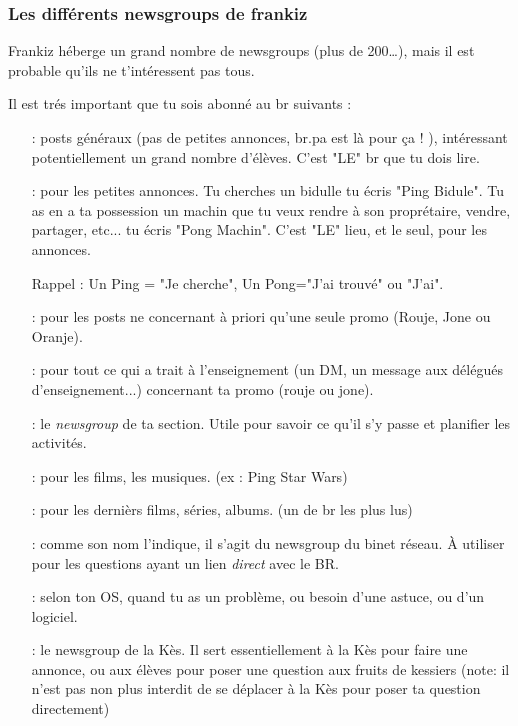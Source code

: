 \subsubsection{Les différents newsgroups de frankiz}
Frankiz héberge un grand nombre de newsgroups (plus de 200\dots ), mais il est probable qu'ils ne t'intéressent pas tous.

Il est trés important  que tu sois abonné au br suivants :
\begin{itemize}
\item[\ngname{br.eleves} :] posts généraux (pas de petites annonces, br.pa est là pour ça ! ), intéressant potentiellement un grand nombre d'élèves. C'est "LE" br que tu dois lire.
	 
\item[\ngname{br.pa} :] pour les petites annonces. Tu cherches un bidulle tu écris "Ping Bidule". Tu as en a ta possession un machin que tu veux rendre à son proprétaire, vendre, partager, etc... tu écris "Pong Machin". C'est "LE" lieu, et le seul, pour les annonces.

\medskip

Rappel : Un Ping = "Je cherche", Un Pong="J'ai trouvé" ou "J'ai".

\medskip


\item[\ngname{br.promo.*} :] pour les posts ne concernant à priori qu'une seule promo (Rouje, Jone ou Oranje).
	 
 \item[\ngname{br.enseignement.*} :] pour tout ce qui a trait à l'enseignement (un DM, un message aux délégués d'enseignement...) concernant ta promo (rouje ou jone).	 
 
 \item[\ngname{br.section.ta\_section\_sportive} :] le \emph{newsgroup} de ta section.                                        Utile pour savoir ce qu'il s'y passe et planifier les activités.

\item[\ngname{br.informatique.media.request} :] pour les films, les musiques. (ex : Ping Star Wars)

\item[\ngname{br.informatique.nouveautés} :] pour les dernièrs films, séries, albums. (un de br les plus lus)

\item[\ngname{br.binet.br} :] comme son nom l'indique, il s'agit du newsgroup du binet réseau. À utiliser pour les questions ayant un lien \emph{direct} avec le BR.

 \item[\ngname{br.informatique.windows/linux/mac} :] selon ton OS, quand tu as un problème, ou besoin d'une astuce, ou d'un logiciel.

 \item[\ngname{br.kes} :] le newsgroup de la Kès. Il sert essentiellement à la Kès pour faire une annonce, ou aux élèves pour poser une question aux fruits de kessiers (note: il n'est pas non plus interdit de se déplacer à la Kès pour poser ta question directement)

\end{itemize}

